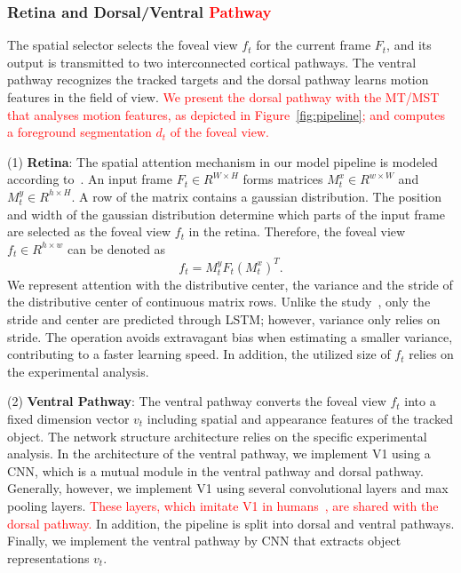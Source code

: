 \documentclass[final,3p,times,twocolumn]{elsarticle}
\begin{document}
\subsubsection{Retina and Dorsal/Ventral \textcolor{red}{Pathway}}
The spatial selector selects the foveal view $f_t$ for the current frame $F_t$,
and its output is transmitted to two interconnected cortical pathways.
The ventral pathway recognizes the tracked targets 
and the dorsal pathway learns motion features in the field of view. 
\textcolor{red}{
We present the dorsal pathway with the MT/MST that analyses motion features, as depicted in Figure~\ref{fig:pipeline};
and computes a foreground segmentation $d_t$ of the foveal view.}

(1) \textbf{Retina}: 
The spatial attention mechanism in our model pipeline is modeled according to~\cite{RATM}. 
An input frame $F_t \in R^{W \times H}$ forms matrices $M_t^x \in R^{w \times W}$ and $M_t^y \in R^{h \times H}$.
A row of the matrix contains a gaussian distribution. 
The position and width of the gaussian distribution determine which parts of the input frame are selected as the foveal view $f_t$ in the retina.
Therefore, the foveal view $f_t \in R^{h \times w}$ can be denoted as
\begin{equation}
f_t = M_t^y F_t (M_t^x)^T.
\end{equation}
We represent attention with the distributive center, the variance and the stride of the distributive center of continuous matrix rows.
Unlike the study~\cite{hart}, only the stride and center are predicted through LSTM;
however, variance only relies on stride.
The operation avoids extravagant bias when estimating a smaller variance, contributing to a faster learning speed. 
In addition, the utilized size of $f_t$ relies on the experimental analysis. 

(2) \textbf{Ventral Pathway}: 
The ventral pathway converts the foveal view $f_t$ into a fixed dimension vector $v_t$ including spatial and appearance features of the tracked object. 
The network structure architecture relies on the specific experimental analysis. 
In the architecture of the ventral pathway, we implement V1 using a CNN, which is a mutual module in the ventral pathway and dorsal pathway.
Generally, however, we implement V1 using several convolutional layers and max pooling layers. 
\textcolor{red}{
These layers, which imitate V1 in humans~\cite{theoretical_neuroscience}, are shared with the dorsal pathway.}
In addition, the pipeline is split into dorsal and ventral pathways. 
Finally, we implement the ventral pathway by CNN that extracts object representations $v_t$.
\end{document}
